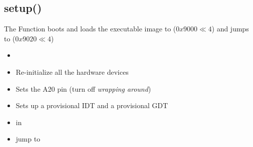 \subsection{setup()}

\begin{frame}{The  Function}
  boots and loads the executable image to ($0x9000\ll 4$) and jumps to ($0x9020\ll 4$)
  \begin{center}
     
  \end{center}
  \begin{itemize}
  \item {}
  \item Re-initialize all the hardware devices
  \item Sets the A20 pin (turn off \emph{wrapping around})
  \item Sets up a provisional IDT and a provisional GDT %
  \item {} in  %
  \item jump to 
  \end{itemize}
\end{frame}

